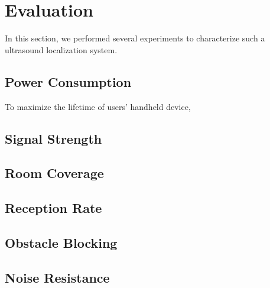 \section{Evaluation}
\label{sec:evaluation}

In this section, we performed several experiments to characterize such a ultrasound localization system.

\subsection{Power Consumption}
\label{sec:power-consumption}
To maximize the lifetime of users' handheld device, 

\subsection{Signal Strength}
\label{sec:signal-strength}

\subsection{Room Coverage}
\label{sec:room-coverage}

\subsection{Reception Rate}
\label{sec:reception-rate}

\subsection{Obstacle Blocking}
\label{sec:obstacle-blocking}

\subsection{Noise Resistance}
\label{sec:noise-resistance}



